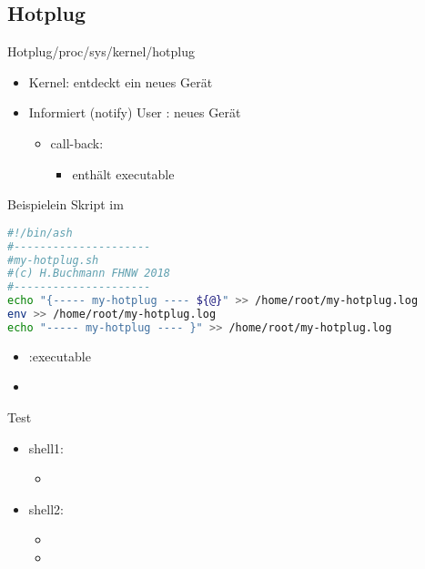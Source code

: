 \subsection{Hotplug}
\begin{frame}{Hotplug}{/proc/sys/kernel/hotplug}
 \begin{itemize}
  \item Kernel: \ksp entdeckt ein neues Gerät
  \item Informiert (notify) User \usp: neues Gerät 
  \begin{itemize}
   \item call-back: 
   \begin{itemize}
    \item enthält \usp executable
   \end{itemize}
  \end{itemize}
 \end{itemize}
\end{frame}

{
\begin{frame}[fragile]{Beispiel}{ein Skript im \usp}
\begin{lstlisting}[language=bash]
#!/bin/ash 
#---------------------
#my-hotplug.sh
#(c) H.Buchmann FHNW 2018
#---------------------
echo "{----- my-hotplug ---- ${@}" >> /home/root/my-hotplug.log
env >> /home/root/my-hotplug.log
echo "----- my-hotplug ---- }" >> /home/root/my-hotplug.log
\end{lstlisting}
\begin{itemize}
 \item {} :executable
 \item {}
\end{itemize}
\end{frame}
}

\begin{frame}{Test}
 \begin{itemize}
  \item shell1: 
  \begin{itemize}
   \item {}
  \end{itemize}
  \item shell2:
   \begin{itemize}
    \item {}
    \item {}
   \end{itemize}
 \end{itemize}
\end{frame}

